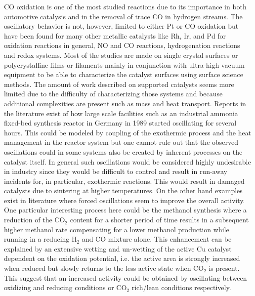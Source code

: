 \documentclass[journal=jacsat,manuscript=article]{achemso}
\begin{document}
CO oxidation is one of the most studied reactions due to its importance in both
automotive catalysis and in the removal of trace CO in hydrogen
streams\cite{IbsBog,Zhang2011}. The oscillatory behavior is not, however, limited to
either Pt or CO oxidation but have been found for many other metallic catalysts
like Rh, Ir, and Pd for oxidation reactions in general, NO and CO reactions,
hydrogenation reactions \cite{Lund2000,SALES1982} and redox
systems\cite{Ibele2010}. Most of the studies
are made on single crystal surfaces or polycrystalline films or filaments mainly in
conjunction with ultra-high vacuum equipment to be able to characterize the
catalyst surfaces using surface science methods. The amount of work described
on supported catalysts seems more limited due to the difficulty of
characterizing those systems and because additional complexities are present
such as mass and heat transport\cite{Meunier2008}. Reports in the literature
exist of how large
scale facilities such as an industrial ammonia fixed-bed synthesis reactor in
Germany in 1989 started oscillating for several hours. This could be modeled by
coupling of the exothermic process and the heat management in the reactor
system \cite{Morud1998} but one cannot rule out that the observed oscillations
could in some systems also be created by inherent processes on the catalyst
itself. In general such oscillations would be considered highly undesirable in
industry since they would be difficult to control and result in run-away
incidents for, in particular, exothermic reactions. This would result in
damaged catalysts due to sintering at higher temperatures. On the other hand
examples exist in literature where forced oscillations seem to improve the
overall activity\cite{IMBIHL1995,Machado2005}. One particular interesting
process here could be the methanol synthesis where a reduction of the CO$_2$
content for a shorter period of time results in a subsequent higher methanol
rate compensating for a lower methanol production while running in a
reducing H$_2$ and CO mixture alone\cite{Dynamics-Bog}. This enhancement can
be explained by an extensive wetting and un-wetting of the active Cu catalyst
dependent on the oxidation potential\cite{Hansen2002}, i.e. the active area is
strongly increased when reduced but slowly returns to the less active state
when CO$_2$ is present. This suggest that an increased activity could be
obtained by oscillating between oxidizing and reducing conditions or CO$_2$
rich/lean conditions respectively.
\end{document}
